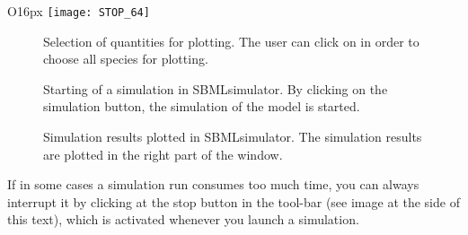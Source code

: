 
\begin{wrapfigure}{O}{16px}
\vspace{\wrapfigspace}
\texttt{[image: STOP\_64]}
\end{wrapfigure}
\begin{figure}[t]
\centering
{}
\caption[Selection of quantities for plotting]{Selection of quantities for plotting.
The user can click on  in order to choose all species for plotting.}
\label{fig:selectSpecies}
\end{figure}
\begin{figure}[t]
\centering
{}
\caption[Starting of a simulation in SBMLsimulator]{Starting of a simulation in SBMLsimulator.
By clicking on the simulation button, the simulation of the model is started.}
\label{fig:startSimulation}
\end{figure}
\begin{figure}[t]
\centering
{}
\caption[Simulation results plotted in SBMLsimulator]{Simulation results plotted in SBMLsimulator.
The simulation results are plotted in the right part of the window.}
\label{fig:simulationResults}
\end{figure}
If in some cases a simulation run consumes too much time, you can always interrupt it by clicking at the stop button in the tool-bar (see image at the side of this text), which is activated whenever you launch a simulation.
